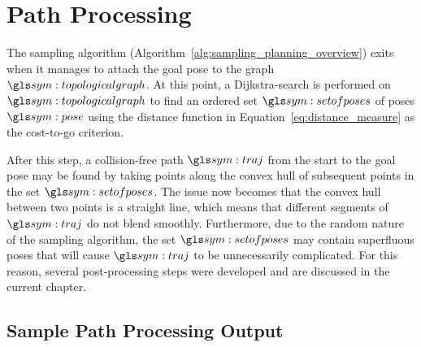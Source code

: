 \chapter{Path Processing}%
\label{chap:path_processing}

	The sampling algorithm (Algorithm~\ref{alg:sampling_planning_overview})
	exits when it manages to attach the goal pose to the graph
	$\topologicalgraph$. At this point, a Dijkstra-search is performed on
	$\topologicalgraph$ to find an ordered set $\setofposes$ of poses $\pose$
	using the distance function in Equation~\ref{eq:distance_measure} as the
	cost-to-go criterion.

	After this step, a collision-free path $\pathsym$ from the start to the goal
	pose may be found by taking points along the convex hull of subsequent
	points in the set $\setofposes$. The issue now becomes that the convex hull
	between two points is a straight line, which means that different segments
	of $\pathsym$ do not blend smoothly. Furthermore, due to the random nature
	of the sampling algorithm, the set $\setofposes$ may contain superfluous
	poses that will cause $\pathsym$ to be unnecessarily complicated. For this
	reason, several post-processing steps were developed and are discussed in
	the current chapter.

	
	


	\section{Sample Path Processing Output}%
	\label{sec:sample_path_processing_output}

